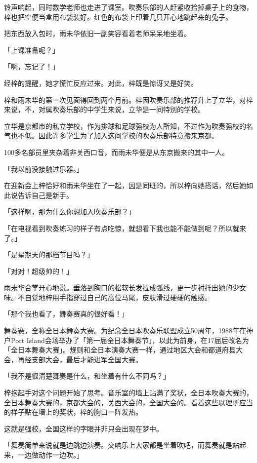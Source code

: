 \documentclass[UTF8]{ctexart}
\begin{document}
    铃声响起，同时数学老师也走进了课室。吹奏乐部的人赶紧收拾掉桌子上的食物，梓也把空便当盒用布袋装好。红色的布袋上印着几只开心地跳起来的兔子。

    把东西放入包时，雨未华依旧一副笑容看着老师呆呆地坐着。

    「上课准备呢？」

    「啊，忘记了！」

    经梓的提醒，她才慌忙反应过来。对此，梓既是惊讶又是好笑。

    梓和雨未华的第一次见面得回到两个月前。梓因吹奏乐部的推荐升上了立华，对梓来说，不，对属吹奏乐部的中学生来说，立华是一间特别的学校。

    立华是京都市的私立学校，作为排球和足球强校为人所知，不过作为吹奏强校的名气也不低。因此许多学生为了加入这间学校的吹奏乐部特意搬来京都。

    100多名部员里夹杂着非关西口音，而雨未华便是从东京搬来的其中一人。

    「我以前没接触过乐器。」

    在迎新会上梓恰好和雨未华坐在了一起，因是同班的，所以梓向她搭话，然后她如此说告诉自己是新手。

    「这样啊，那为什么你想加入吹奏乐部？」

    「在电视看到吹奏练习的样子有点吃惊，就想看下我也能不能做到呢？所以就来了。」

    「是星期天的那档节目吗？」

    「对对！超级帅的！」

    雨未华合掌开心地说。垂落到胸口的松软长发拉成弧线，更一步衬托出她的少女味。不自觉地梓用手指穿过自己的高位马尾，皮肤滑过硬硬的触感。

    「那个我也看了，舞奏赛真的很好看！」

    舞奏赛，全称全日本舞奏大赛。为纪念全日本吹奏乐联盟成立50周年，1988年在神户Port Island会场举办了「第一届全日本舞奏节」，以此为前身，在17届后改名为「全日本舞奏大赛」。规则和全日本演奏大赛一样，通过地区大会和都道府县大会，再经支部大会，最后才能进军全国大赛。

    「我不是很清楚舞奏是什么，和坐着有什么不同吗？」

    梓抱起手对这个问题开始了思考。音乐室的墙上贴满了奖状，全日本吹奏大赛的，全日本舞奏大赛的，京都大会的，关西大会的，全国大会的。看着这些以理所应当的样子贴在墙上的奖状，梓的胸口一阵发热。

    这就是强校，全国这样的字眼并非只会出现在梦中。

    「舞奏简单来说就是边跳边演奏。交响乐上大家都是坐着吹吧，而舞奏就是站起来，一边做动作一边吹。」
\end{document}
